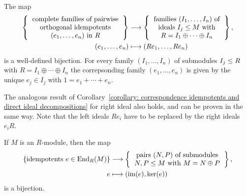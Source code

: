 

\begin{corollary}
  \label{corollary: correspondence idempotents and direct ideal decompositions}
  The map
  \begin{align*}
    \left\{
      \begin{tabular}{c}
        complete families of pairwise \\
        orthogonal idempotents  \\
        $(e_1, \dotsc, e_n)$ in $R$
      \end{tabular}
    \right\}
    &\longto
      \left\{
      \begin{tabular}{c}
        families $(I_1, \dotsc, I_n)$ of  \\
        ideals $I_j \moduleleq M$ with \\
        $R = I_1 \oplus \dotsb \oplus I_n$
      \end{tabular}
      \right\},
    \\
                  (e_1, \dotsc, e_n)
    &\longmapsto  (Re_1, \dotsc, Re_n)
  \end{align*}
  is a well-defined bijection.
  For every family $(I_1, \dotsc, I_n)$ of submodules $I_j \leq R$ with $R = I_1 \oplus \dotsb \oplus I_n$ the correpsonding family $(e_1, \dotsc, e_n)$ is given by the unique $e_j \in I_j$ with $1 = e_1 + \dotsb + e_n$.
\end{corollary}




\begin{remark}
  The analogous result of Corollary~\ref{corollary: correspondence idempotents and direct ideal decompositions} for right ideal also holds, and can be proven in the same way.
  Note that the left ideals $R e_i$ have to be replaced by the right ideals $e_i R$.
\end{remark}


\begin{corollary}
  If $M$ is an $R$-module, then the map
  \begin{align*}
    \{ \text{idempotents $e \in \End_R(M)$} \}
    &\longto
      \left\{
      \begin{tabular}{c}
        pairs $(N,P)$ of submodules \\
        $N, P \moduleleq M$ with $M = N \oplus P$
      \end{tabular}
      \right\},
    \\
                  e
    &\longmapsto  (\im(e), \ker(e))
  \end{align*}
  is a bijection.
\end{corollary}


